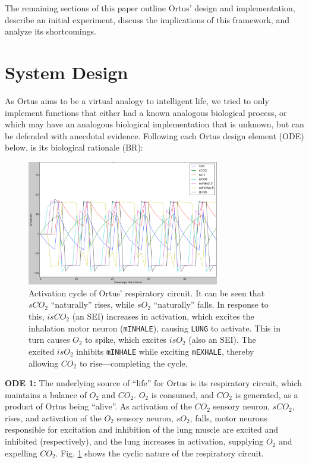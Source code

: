 \documentclass[letterpaper]{article}
\begin{document}
The remaining sections of this paper outline Ortus' design and implementation, describe an initial experiment, discuss the implications of this framework, and analyze its shortcomings.

\section{System Design}


As Ortus aims to be a virtual analogy to intelligent life, we tried to only implement functions that either had a known analogous biological process, or which may have an analogous biological implementation that is unknown, but can be defended with anecdotal evidence. Following each Ortus design element (ODE) below, is its biological rationale (BR):


\begin{figure}
\begin{center}
\includegraphics[width=3.3in]{images/respiration.png}
\caption{Activation cycle of Ortus' respiratory circuit. It can be seen that $sCO_2$ ``naturally'' rises, while $sO_2$ ``naturally'' falls. In response to this, $isCO_2$ (an SEI) increases in activation, which excites the inhalation motor neuron (\texttt{mINHALE}), causing \texttt{LUNG} to activate. This in turn causes $O_2$ to spike, which excites $isO_2$ (also an SEI). The excited $isO_2$ inhibits \texttt{mINHALE} while exciting \texttt{mEXHALE}, thereby allowing $CO_2$ to rise---completing the cycle.}
\label{respiration}
\end{center}
\end{figure}


\textbf{ODE 1:} The underlying source of ``life'' for Ortus is its respiratory circuit, which maintains a balance of $O_2$ and $CO_2$. $O_2$ is consumed, and $CO_2$ is generated, as a product of Ortus being ``alive''. As activation of the $CO_2$ sensory neuron, $sCO_2$, rises, and activation of the $O_2$ sensory neuron, $sO_2$, falls, motor neurons responsible for excitation and inhibition of the lung muscle are excited and inhibited (respectively), and the lung increases in activation, supplying $O_2$ and expelling $CO_2$. Fig. \ref{respiration} shows the cyclic nature of the respiratory circuit.
\end{document}
